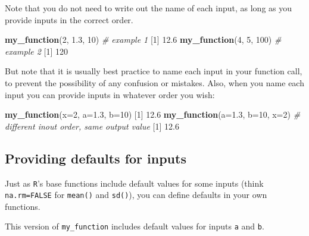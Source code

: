 \documentclass[
]{book}
\newenvironment{Shaded}{\begin{snugshade}}{\end{snugshade}}
\newcommand{\CommentTok}[1]{\textcolor[rgb]{0.56,0.35,0.01}{\textit{#1}}}
\newcommand{\DataTypeTok}[1]{\textcolor[rgb]{0.13,0.29,0.53}{#1}}
\newcommand{\DecValTok}[1]{\textcolor[rgb]{0.00,0.00,0.81}{#1}}
\newcommand{\FloatTok}[1]{\textcolor[rgb]{0.00,0.00,0.81}{#1}}
\newcommand{\KeywordTok}[1]{\textcolor[rgb]{0.13,0.29,0.53}{\textbf{#1}}}
\newcommand{\NormalTok}[1]{#1}
\begin{document}
Note that you do not need to write out the name of each input, as long as you provide inputs in the correct order.

\begin{Shaded}
\begin{Highlighting}[]
\KeywordTok{my_function}\NormalTok{(}\DecValTok{2}\NormalTok{, }\FloatTok{1.3}\NormalTok{, }\DecValTok{10}\NormalTok{) }\CommentTok{# example 1}
\NormalTok{[}\DecValTok{1}\NormalTok{] }\FloatTok{12.6}
\KeywordTok{my_function}\NormalTok{(}\DecValTok{4}\NormalTok{, }\DecValTok{5}\NormalTok{, }\DecValTok{100}\NormalTok{) }\CommentTok{# example 2}
\NormalTok{[}\DecValTok{1}\NormalTok{] }\DecValTok{120}
\end{Highlighting}
\end{Shaded}

But note that it is usually best practice to name each input in your function call, to prevent the possibility of any confusion or mistakes. Also, when you name each input you can provide inputs in whatever order you wish:

\begin{Shaded}
\begin{Highlighting}[]
\KeywordTok{my_function}\NormalTok{(}\DataTypeTok{x=}\DecValTok{2}\NormalTok{, }\DataTypeTok{a=}\FloatTok{1.3}\NormalTok{, }\DataTypeTok{b=}\DecValTok{10}\NormalTok{)}
\NormalTok{[}\DecValTok{1}\NormalTok{] }\FloatTok{12.6}
\KeywordTok{my_function}\NormalTok{(}\DataTypeTok{a=}\FloatTok{1.3}\NormalTok{, }\DataTypeTok{b=}\DecValTok{10}\NormalTok{, }\DataTypeTok{x=}\DecValTok{2}\NormalTok{) }\CommentTok{# different inout order, same output value}
\NormalTok{[}\DecValTok{1}\NormalTok{] }\FloatTok{12.6}
\end{Highlighting}
\end{Shaded}

\hypertarget{providing-defaults-for-inputs}{%
\subsection*{Providing defaults for inputs}\label{providing-defaults-for-inputs}}

Just as \texttt{R}'s base functions include default values for some inputs (think \texttt{na.rm=FALSE} for \texttt{mean()} and \texttt{sd()}), you can define defaults in your own functions.

This version of \texttt{my\_function} includes default values for inputs \texttt{a} and \texttt{b}.
\end{document}
